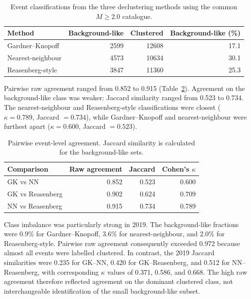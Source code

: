\begin{table}[htbp]
\centering
\caption{Event classifications from the three declustering methods using the
common $M\geq2.0$ catalogue.}
\label{tab:declustering_summary}
\begin{tabular}{lrrr}
\toprule
Method & Background-like & Clustered & Background-like (\%) \\
\midrule
Gardner--Knopoff & 2599 & 12608 & 17.1 \\
Nearest-neighbour & 4573 & 10634 & 30.1 \\
Reasenberg-style & 3847 & 11360 & 25.3 \\
\bottomrule
\end{tabular}
\end{table}

Pairwise raw agreement ranged from 0.852 to 0.915
(Table~\ref{tab:declustering_agreement}). Agreement on the background-like
class was weaker: Jaccard similarity ranged from 0.523 to 0.734. The
nearest-neighbour and Reasenberg-style classifications were closest
($\kappa=0.789$, Jaccard $=0.734$), while Gardner--Knopoff and
nearest-neighbour were furthest apart ($\kappa=0.600$, Jaccard $=0.523$).

\begin{table}[htbp]
\centering
\caption{Pairwise event-level agreement. Jaccard similarity is calculated for
the background-like sets.}
\label{tab:declustering_agreement}
\begin{tabular}{lrrr}
\toprule
Comparison & Raw agreement & Jaccard & Cohen's $\kappa$ \\
\midrule
GK vs NN & 0.852 & 0.523 & 0.600 \\
GK vs Reasenberg & 0.902 & 0.624 & 0.709 \\
NN vs Reasenberg & 0.915 & 0.734 & 0.789 \\
\bottomrule
\end{tabular}
\end{table}

Class imbalance was particularly strong in 2019. The background-like
fractions were 0.9\% for Gardner--Knopoff, 3.6\% for nearest-neighbour, and
2.0\% for Reasenberg-style. Pairwise raw agreement consequently exceeded
0.972 because almost all events were labelled clustered. In contrast, the
2019 Jaccard similarities were 0.235 for GK--NN, 0.420 for GK--Reasenberg,
and 0.512 for NN--Reasenberg, with corresponding $\kappa$ values of 0.371,
0.586, and 0.668. The high raw agreement therefore reflected agreement on the
dominant clustered class, not interchangeable identification of the small
background-like subset.

